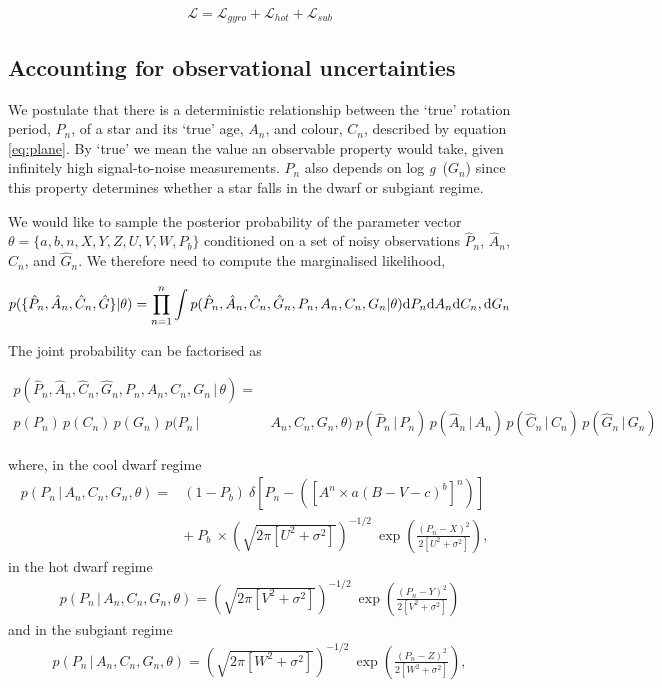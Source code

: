 \documentclass[10pt,preprint]{aastex}
\newcommand{\logg}{log \emph{g}~}
\newcommand{\ah}{$\hat{A}_n$}
\newcommand{\ph}{$\hat{P}_n$}
\newcommand{\ch}{$\hat{C}_n$}
\newcommand{\gh}{$\hat{G}_n$}
\begin{document}
\begin{equation}
	\mathcal{L} = \mathcal{L}_{gyro} + \mathcal{L}_{hot} + \mathcal{L}_{sub}
\end{equation}

\subsection{Accounting for observational uncertainties}

We postulate that there is a deterministic relationship between the `true' rotation period, $P_n$, of a star and its `true' age, $A_n$, and colour, $C_n$, described by equation \ref{eq:plane}.
By `true' we mean the value an observable property would take, given infinitely high signal-to-noise measurements.
$P_n$ also depends on \logg($G_n$) since this property determines whether a star falls in the dwarf or subgiant regime.

We would like to sample the posterior probability of the parameter vector $\theta = \{a, b, n, X, Y, Z, U, V, W, P_b\}$ conditioned on a set of noisy observations \ph, \ah, \ch, and \gh.
We therefore need to compute the marginalised likelihood,

\begin{equation}
	p(\{\hat{P}_n,\hat{A}_n,\hat{C}_n,\hat{G}\}|\theta) =
	\prod_{n=1}^{n} \int p(\hat{P}_n,\hat{A}_n,\hat{C}_n,\hat{G}_n,P_n,A_n,C_n,G_n|\theta)
	{\rm d}P_n {\rm d}A_n {\rm d}C_n,{\rm d}G_n
\label{eq:fulll}
\end{equation}

The joint probability can be factorised as

\begin{align}
	p(\hat{P}_n,\hat{A}_n,\hat{C}_n,\hat{G}_n,P_n,A_n,C_n,G_n\,|\,\theta) = & \nonumber \\
	p(P_n)\,p(C_n)\,p(G_n)\,p(P_n\,| & \,A_n,C_n,G_n,\theta)\
        p(\hat{P}_n\,|\,P_n)\,p(\hat{A}_n\,|\,A_n)\,p(\hat{C}_n\,|\,C_n)\,p(\hat{G}_n\,|\,G_n)
\nonumber
\end{align}

where, in the cool dwarf regime
\begin{eqnarray}
p(P_n\,|\,A_n,C_n,G_n,\theta) =
	& (1-P_b)~\delta \left [P_n - \left(\left[A^n \times a(B-V - c)^b\right]^n\right) \right] \quad \\
	& +~P_b~\times \left(\sqrt{2\pi[U^2+\sigma^2]}\right)^{-1/2}~\exp\left({\frac{(P_n-X)^2}{2[U^2+\sigma^2]}}\right),
\end{eqnarray}
in the hot dwarf regime
\begin{eqnarray}
p(P_n\,|\,A_n,C_n,G_n,\theta) = \left(\sqrt{2\pi[V^2+\sigma^2]}\right)^{-1/2}~\exp\left({\frac{(P_n-Y)^2}{2[V^2+\sigma^2]}}\right)
\end{eqnarray}
and in the subgiant regime
\begin{eqnarray}
p(P_n\,|\,A_n,C_n,G_n,\theta) = \left(\sqrt{2\pi[W^2+\sigma^2]}\right)^{-1/2}~\exp\left({\frac{(P_n-Z)^2}{2[W^2+\sigma^2]}}\right),
\end{eqnarray}
\end{document}
